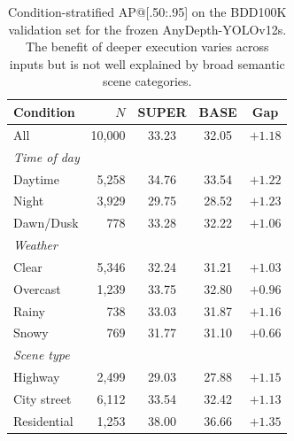 \begin{table}[t]
\centering
\caption{
    Condition-stratified AP@[.50:.95] on the BDD100K validation set for the frozen AnyDepth-YOLOv12s. 
    The benefit of deeper execution varies across inputs but is not well explained by broad semantic scene categories.
}
\label{tab:condition_stratified}
\begin{tabular}{lrccc}
\toprule
Condition & $N$ & SUPER & BASE & Gap \\
\midrule
All & 10,000 & 33.23 & 32.05 & $+1.18$ \\
\midrule
\multicolumn{5}{l}{\emph{Time of day}} \\
\quad Daytime & 5,258 & 34.76 & 33.54 & $+1.22$ \\
\quad Night & 3,929 & 29.75 & 28.52 & $+1.23$ \\
\quad Dawn/Dusk & 778 & 33.28 & 32.22 & $+1.06$ \\
\midrule
\multicolumn{5}{l}{\emph{Weather}} \\
\quad Clear & 5,346 & 32.24 & 31.21 & $+1.03$ \\
\quad Overcast & 1,239 & 33.75 & 32.80 & $+0.96$ \\
\quad Rainy & 738 & 33.03 & 31.87 & $+1.16$ \\
\quad Snowy & 769 & 31.77 & 31.10 & $+0.66$ \\
\midrule
\multicolumn{5}{l}{\emph{Scene type}} \\
\quad Highway & 2,499 & 29.03 & 27.88 & $+1.15$ \\
\quad City street & 6,112 & 33.54 & 32.42 & $+1.13$ \\
\quad Residential & 1,253 & 38.00 & 36.66 & $+1.35$ \\
\bottomrule
\end{tabular}
\end{table}

